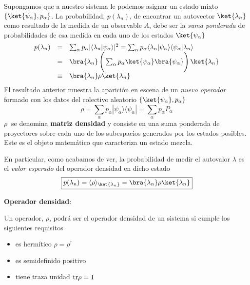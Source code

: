 \documentclass[a4paper,11pt]{book} %
\numberwithin{equation}{chapter}
\newcommand{\braket}[2]{\langle #1|#2\rangle}
\newcommand{\ketbra}[2]{| #1\rangle \! \langle #2|}
\begin{document}
Supongamos que a nuestro sistema le podemos asignar un estado mixto $\{\ket{\psi_\alpha},p_\alpha\}$. La probabilidad, $p(\lambda_n)$, de encontrar un autovector $\ket{\lambda_n}$ como resultado de la medida de un observable $A$, debe ser la \textit{suma ponderada} de probabilidades  de esa medida en cada uno de los estados $\ket{\psi_\alpha}$
	\begin{equation} \label{ec_fundamentos_op_dens_prob}
	\begin{array}{rcl} 
p(\lambda_n) &=& \sum_\alpha p_\alpha |\braket{\lambda_n}{\psi_\alpha}|^2  =  \sum_\alpha p_\alpha \braket{\lambda_n}{\psi_\alpha}\braket{\psi_\alpha}{\lambda_n} \\ \rule{0mm}{6mm}
&=& \bra{\lambda_n}\left(\rule{0mm}{6mm}\sum_\alpha p_\alpha \ket{\psi_\alpha}\bra{\psi_\alpha}\right)\ket{\lambda_n} \\
&\equiv&\bra{\lambda_n}\rho\ket{\lambda_n}\\
\end{array}
	\end{equation}
El resultado anterior muestra la aparición en escena de un \textit{nuevo operador} formado con los datos del colectivo aleatorio $\{\ket{\psi_\alpha},p_\alpha\}$  
	\begin{equation} \label{ec_fundamentos_operador_densidad_diag}
	\boxed{\rho = \sum_\alpha p_\alpha \ketbra{\psi_\alpha}{\psi_\alpha} = \sum_\alpha p_\alpha P_\alpha}
	\end{equation}
$\rho ~$ se denomina \textbf{matriz densidad} y consiste en una suma ponderada de proyectores sobre cada uno de los subespacios generados por los estados posibles. Este es el objeto matemático que caracteriza un estado mezcla. 

En particular, como acabamos de ver, la probabilidad de medir el autovalor $\lambda$ es el \textit{valor esperado} del operador densidad en dicho estado
	\begin{equation}
	\boxed{p(\lambda_n) =\langle \rho \rangle_{\ket{\lambda_n}} = \bra{\lambda_n }\rho\ket{\lambda_n}}
	\end{equation}

\begin{mybox_gray2}{}
\textbf{Operador densidad}:

Un operador, $\rho$, podrá ser el operador densidad de un sistema si cumple los siguientes requisitos    
\begin{itemize}
	\item es hermítico $\rho = \rho^\dagger$
	\item es semidefinido positivo
	\item tiene traza unidad ${\rm tr }\rho = 1$ 
\end{itemize}

\end{mybox_gray2}
\end{document}
